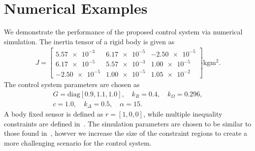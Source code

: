 \documentclass[letterpaper, 10 pt, conference]{ieeeconf}  %
\begin{document}
\section{Numerical Examples}
We demonstrate the performance of the proposed control system via numerical simulation.
The inertia tensor of a rigid body is given as
\begin{gather*}
	J = \begin{bmatrix}
	\num{5.57e-3} & \num{6.17e-5} & \num{-2.50e-5} \\
	\num{6.17e-5} & \num{5.57e-3} & \num{1.00e-5} \\
	\num{-2.50e-5} & \num{1.00e-5} & \num{1.05e-2}
	\end{bmatrix} \si{\kilo\gram\meter\squared} .
\end{gather*} 
The control system parameters are chosen as
\begin{gather*}
	G = \text{diag} [0.9,1.1,1.0], \quad k_R = 0.4 , \quad	k_\Omega = 0.296 ,\\
	c = 1.0 , \quad k_\Delta = 0.5 , \quad \alpha = 15 .
\end{gather*}
A body fixed sensor is defined as \(r = [1,0,0]\), while multiple inequality constraints are defined in~.
The simulation parameters are chosen to be similar to those found in~\cite{lee2011b}, howver we increase the size of the constraint regions to create a more challenging scenario for the control system.
\end{document}
